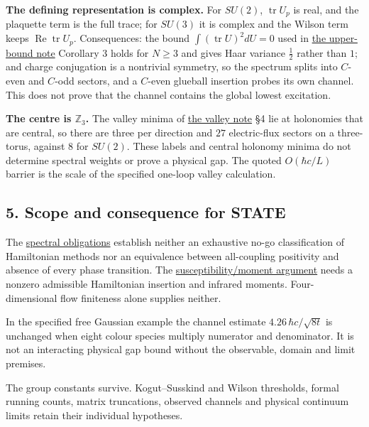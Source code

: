 \documentclass[11pt,a4paper]{article}
\begin{document}
\textbf{The defining representation is complex.} For \(SU(2)\),
\(\operatorname{tr}U_p\) is real, and the plaquette term is the full
trace; for \(SU(3)\) it is complex and the Wilson term keeps
\(\operatorname{Re}\operatorname{tr}U_p\). Consequences: the bound
\(\int(\operatorname{tr}U)^2dU=0\) used in
\href{lattice-gap-upper-bounds.md}{the upper-bound note} Corollary 3
holds for \(N\ge3\) and gives Haar variance \(\tfrac12\) rather than
\(1\); and charge conjugation is a nontrivial symmetry, so the spectrum
splits into \(C\)-even and \(C\)-odd sectors, and a \(C\)-even glueball
insertion probes its own channel. This does not prove that the channel
contains the global lowest excitation.

\textbf{The centre is \(\mathbb Z_3\).} The valley minima of
\href{torus-valley-potential.md}{the valley note} §4 lie at holonomies
that are central, so there are three per direction and \(27\)
electric-flux sectors on a three-torus, against \(8\) for \(SU(2)\).
These labels and central holonomy minima do not determine spectral
weights or prove a physical gap. The quoted \(O(\hbar c/L)\) barrier is
the scale of the specified one-loop valley calculation.

\hypertarget{scope-and-consequence-for-state}{%
\subsection{5. Scope and consequence for
STATE}\label{scope-and-consequence-for-state}}

The \href{mass-gap-obligations-lattice.md}{spectral obligations}
establish neither an exhaustive no-go classification of Hamiltonian
methods nor an equivalence between all-coupling positivity and absence
of every phase transition. The
\href{finiteness-half-flowed-susceptibility.md}{susceptibility/moment
argument} needs a nonzero admissible Hamiltonian insertion and infrared
moments. Four-dimensional flow finiteness alone supplies neither.

In the specified free Gaussian example the channel estimate
\(4.26\,\hbar c/\sqrt{8t}\) is unchanged when eight colour species
multiply numerator and denominator. It is not an interacting physical
gap bound without the observable, domain and limit premises.

The group constants survive. Kogut--Susskind and Wilson thresholds,
formal running counts, matrix truncations, observed channels and
physical continuum limits retain their individual hypotheses.
\end{document}

